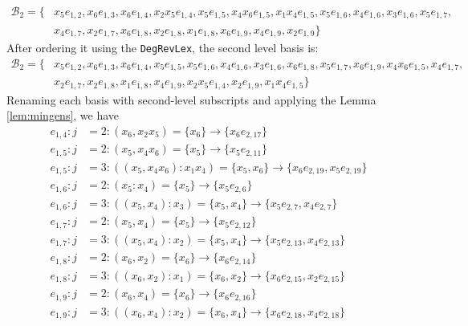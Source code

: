 \documentclass{article}
\theoremstyle{definition}
\theoremstyle{remark}
\theoremstyle{example}
\begin{document}
\begin{equation}
    \begin{aligned}
        \mathcal{B}_2 = \{&x_5e_{1,2},x_6e_{1,3},x_6e_{1,4},x_2x_5e_{1,4},x_5e_{1,5},x_4x_6e_{1,5},x_1x_4e_{1,5},x_5e_{1,6},x_4e_{1,6},x_3e_{1,6},x_5e_{1,7},\\
        & x_4e_{1,7},x_2e_{1,7},x_6e_{1,8},x_2e_{1,8},x_1e_{1,8},x_6e_{1,9},x_4e_{1,9},x_2e_{1,9}\}
    \end{aligned}
\end{equation}
After ordering it using the \verb+DegRevLex+, the second level basis is:
\begin{equation}
    \begin{aligned}
        \mathcal{B}_2 = \{&x_5e_{1,2},x_6e_{1,3},x_6e_{1,4},x_5e_{1,5},x_5e_{1,6},x_4e_{1,6},x_3e_{1,6},x_6e_{1,8},x_5e_{1,7},x_6e_{1,9},x_4x_6e_{1,5},x_4e_{1,7},\\
        & x_2e_{1,7},x_2e_{1,8},x_1e_{1,8},x_4e_{1,9},x_2x_5e_{1,4},x_2e_{1,9},x_1x_4e_{1,5}\}
    \end{aligned}
\end{equation}
Renaming each basis with second-level subscripts and applying the Lemma \ref{lem:mingens}, we have
\begin{align}
    e_{1,4}: j &= 2: (x_6,x_2x_5) = \{x_6\} \rightarrow\{x_6e_{2,17}\}\\
    e_{1,5}: j &= 2: (x_5,x_4x_6) = \{x_5\} \rightarrow\{x_5e_{2,11}\}\\
    e_{1,5}: j &= 3: ((x_5,x_4x_6):x_1x_4) = \{x_5,x_6\} \rightarrow\{x_6e_{2,19},x_5e_{2,19}\}\\
    e_{1,6}: j &= 2: (x_5:x_4) = \{x_5\} \rightarrow\{x_5e_{2,6}\}\\
    e_{1,6}: j &= 3: ((x_5,x_4):x_3) = \{x_5,x_4\} \rightarrow\{x_5e_{2,7},x_4e_{2,7}\}\\    
    e_{1,7}: j &= 2: (x_5,x_4) = \{x_5\} \rightarrow\{x_5e_{2,12}\}\\
    e_{1,7}: j &= 3: ((x_5,x_4):x_2) = \{x_5,x_4\} \rightarrow\{x_5e_{2,13},x_4e_{2,13}\}\\
    e_{1,8}: j &= 2: (x_6,x_2) = \{x_6\} \rightarrow\{x_6e_{2,14}\}\\
    e_{1,8}: j &= 3: ((x_6,x_2):x_1) = \{x_6,x_2\} \rightarrow\{x_6e_{2,15},x_2e_{2,15}\}\\
    e_{1,9}: j &= 2: (x_6,x_4) = \{x_6\} \rightarrow\{x_6e_{2,16}\}\\
    e_{1,9}: j &= 3: ((x_6,x_4):x_2) = \{x_6,x_4\} \rightarrow\{x_6e_{2,18},x_4e_{2,18}\}
\end{align}
\end{document}
